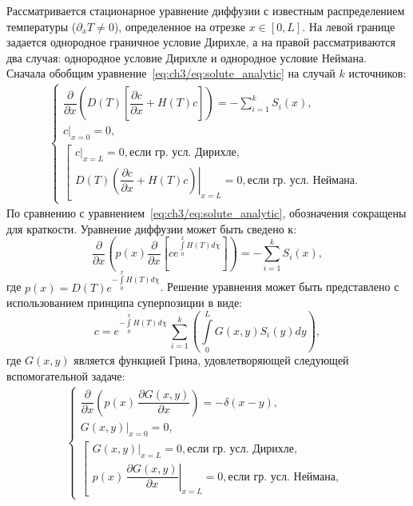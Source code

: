 Рассматривается стационарное уравнение диффузии с известным распределением температуры ($\partial_x T \neq 0$), определенное на отрезке \( x \in [0, L] \). На левой границе задается однородное граничное условие Дирихле, а на правой рассматриваются два случая: однородное условие Дирихле и однородное условие Неймана. Сначала обобщим уравнение~\eqref{eq:ch3/eq:solute_analytic} на случай $k$ источников:
\begin{align}
    \label{eq:general_stat_dif}
    \begin{cases}
        \dfrac{\partial}{\partial x}\left( D(T)\left[ \dfrac{\partial c}{\partial x} + H(T)c\right]\right)=-\sum\limits_{i=1}^k S_i(x), \\[5pt]
        \left.c\right\vert_{x=0}=0,                                                                                                     \\[5pt]
        \left[\begin{array}{ll}
                  \left.c\right\vert_{x=L}=0,  \text{если гр. усл. Дирихле}, \\[5pt]
                  \left.D(T)\left( \dfrac{\partial c}{\partial x} + H(T)c\right)\right\vert_{x=L}=0,  \text{если гр. усл. Неймана}.
              \end{array}
        \right.
    \end{cases}
\end{align}
По сравнению с уравнением~\eqref{eq:ch3/eq:solute_analytic}, обозначения сокращены для краткости. Уравнение диффузии может быть сведено к:
\begin{equation}
    \frac{\partial}{\partial x}\left(p(x)\frac{\partial}{\partial x}\left[ ce^{\int\limits_0^x H(T)d\chi}\right]\right)=-\sum\limits_{i=1}^k S_i(x),
\end{equation}
где $p(x)=D(T)e^{-\int\limits_0^x H(T)d\chi}$. Решение уравнения может быть представлено с использованием принципа суперпозиции в виде:
\begin{equation}
    \label{eq:ST}
    c=e^{-\int\limits_0^x H(T)d\chi}\,\sum\limits_{i=1}^k \left( \int\limits_0^L G(x,y)S_i(y)dy \right),
\end{equation}
где $G(x,y)$ является функцией Грина, удовлетворяющей следующей вспомогательной задаче:
\begin{align}
    \label{eq:Green_problem}
    \begin{cases}
        \dfrac{\partial}{\partial x}\left(p(x)\,\dfrac{\partial G(x,y)}{\partial x}\right)=-\delta(x-y), \\[5pt]
        \left.G(x,y)\right\vert_{x=0}=0,                                                                 \\[5pt]
        \left[\begin{array}{ll}
                  \left.G(x,y)\right\vert_{x=L}=0,  \text{если гр. усл. Дирихле}, \\[5pt]
                  \left.p(x)\,\dfrac{\partial G(x,y)}{\partial x}\right\vert_{x=L}=0,  \text{если гр. усл. Неймана},
              \end{array}\right.
    \end{cases}
\end{align}
